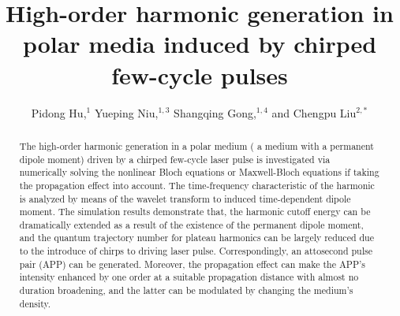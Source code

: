 \documentclass[10pt,letterpaper]{article}
\begin{document}
\title{High-order harmonic generation in polar media induced by chirped few-cycle pulses}

\author{Pidong Hu,$^1$ Yueping Niu,$^{1,3}$ Shangqing Gong,$^{1,4}$  and Chengpu Liu$^{2,*}$}

\address{$^1$Department of Physics, East China University of Science and Technology, \\
Meilong Road 130, Shanghai 200237, China\\
$^2$State Key Laboratory of High Field Laser Physics, Shanghai Institute of Optics and Fine Mechanics, Chinese Academy of Sciences, Qinghe Road 390, Shanghai 201800, China\\
$^{3}$niuyp@ecust.edu.cn\\
$^{4}$sqgong@ecust.edu.cn
}




\begin{abstract}
The high-order harmonic generation in a polar medium ( a medium with a permanent dipole moment) driven by a chirped few-cycle laser pulse is investigated via numerically solving the nonlinear Bloch equations or Maxwell-Bloch equations if taking the propagation effect into account. The time-frequency characteristic of the harmonic is analyzed by means of the wavelet transform to induced time-dependent dipole moment. The simulation results demonstrate that, the harmonic cutoff energy can be dramatically extended as a result of the existence of the permanent dipole moment, and the quantum trajectory number for plateau harmonics can be largely reduced due to the introduce of chirps to driving laser pulse. Correspondingly, an attosecond pulse pair (APP) can be generated. Moreover, the propagation effect can make the APP's intensity enhanced by one order at a suitable propagation distance with almost no duration broadening, and the latter can be modulated by changing the medium's density.
\end{abstract}

\end{document}
